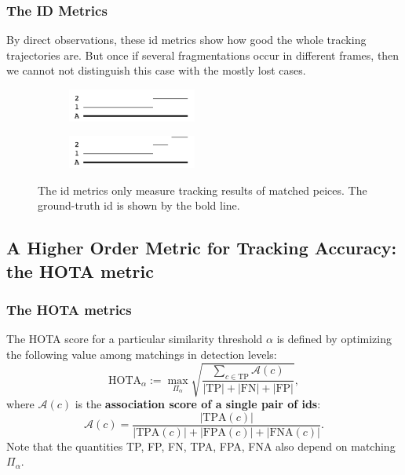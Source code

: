 \documentclass[slidetop, mathserif]{beamer}
\begin{document}
\begin{frame}
	\frametitle{The ID Metrics}
	
	By direct observations, these id metrics show how good the whole tracking trajectories are.
	But once if several fragmentations occur in different frames,
	then we cannot not distinguish this case with the mostly lost cases.
	
	\begin{figure}
		\begin{subfigure}{.5\textwidth}
			\centering
			\includegraphics[width=120pt]{pics/fig6.png}
		\end{subfigure}%
		\begin{subfigure}{.5\textwidth}
			\centering
			\includegraphics[width=120pt]{pics/fig7.png}
		\end{subfigure}
		\caption{The id metrics only measure tracking results of matched peices.
		The ground-truth id is shown by the bold line.}
	\end{figure}
	
\end{frame}

\subsection{A Higher Order Metric for Tracking Accuracy: the HOTA metric}

\begin{frame}
    \frametitle{The HOTA metrics}

    The HOTA score for a particular similarity threshold $\alpha$ is defined by
    optimizing the following value among matchings in detection levels:
    \[
        \text{HOTA}_\alpha := 
        \max_{\Pi_\alpha} \sqrt{\dfrac{\sum_{c\in\text{TP}} \mathcal A(c) }{|\text{TP}|+|\text{FN}|+|\text{FP}|}},
    \]
    where $\mathcal A(c)$ is the {\bf association score of a single pair of ids}:
    \[
        \mathcal A(c) = \dfrac{|\text{TPA}(c)|}{|\text{TPA}(c)|+|\text{FPA}(c)|+|\text{FNA}(c)|}.
    \]
    Note that the quantities TP, FP, FN, TPA, FPA, FNA also depend on matching $\Pi_\alpha$.

\end{frame}
\end{document}
